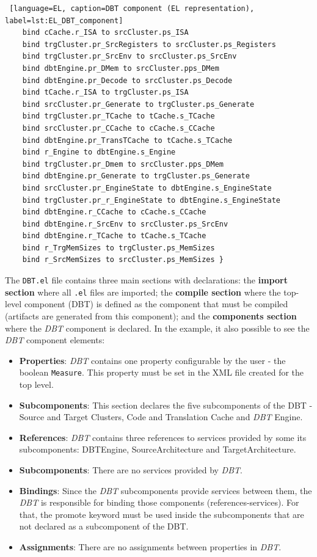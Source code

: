 \documentclass[12pt]{article}
\begin{document}
{\begin{lstlisting} [language=EL, caption=DBT component (EL representation), label=lst:EL_DBT_component]
	bind cCache.r_ISA to srcCluster.ps_ISA
	bind trgCluster.pr_SrcRegisters to srcCluster.ps_Registers
	bind trgCluster.pr_SrcEnv to srcCluster.ps_SrcEnv
	bind dbtEngine.pr_DMem to srcCluster.pps_DMem
	bind dbtEngine.pr_Decode to srcCluster.ps_Decode
	bind tCache.r_ISA to trgCluster.ps_ISA
	bind srcCluster.pr_Generate to trgCluster.ps_Generate
	bind trgCluster.pr_TCache to tCache.s_TCache
	bind srcCluster.pr_CCache to cCache.s_CCache
	bind dbtEngine.pr_TransTCache to tCache.s_TCache
	bind r_Engine to dbtEngine.s_Engine
	bind trgCluster.pr_Dmem to srcCluster.pps_DMem				
	bind dbtEngine.pr_Generate to trgCluster.ps_Generate    	
	bind srcCluster.pr_EngineState to dbtEngine.s_EngineState 	
	bind trgCluster.pr_r_EngineState to dbtEngine.s_EngineState 
	bind dbtEngine.r_CCache to cCache.s_CCache					
	bind dbtEngine.r_SrcEnv to srcCluster.ps_SrcEnv			
	bind dbtEngine.r_TCache to tCache.s_TCache
	bind r_TrgMemSizes to trgCluster.ps_MemSizes
	bind r_SrcMemSizes to srcCluster.ps_MemSizes }
\end{lstlisting}

The \texttt{DBT.el} file contains three main sections with declarations: the \textbf{import section} where all \texttt{.el}
 files are imported; the \textbf{compile section} where the top-level component (DBT) is defined as the component that must be compiled (artifacts are generated from this component); and the \textbf{components section} where the \textit{DBT} component is declared.
In the example, it also possible to see the \textit{DBT} component elements:
\begin{itemize}
\item \textbf{Properties}: \textit{DBT} contains one property configurable by the user - the boolean \texttt{Measure}. This property must be set in the XML file created for the top level.
\item \textbf{Subcomponents}: This section declares the five subcomponents of the DBT - Source and Target Clusters, Code and Translation Cache and \textit{DBT} Engine.
\item \textbf{References}: \textit{DBT} contains three references to services provided by some its subcomponents: DBTEngine, SourceArchitecture and TargetArchitecture.
\item \textbf{Subcomponents}: There are no services provided by \textit{DBT}.
\item \textbf{Bindings}: Since the \textit{DBT} subcomponents provide services between them, the \textit{DBT} is responsible for binding those components (references-services). For that, the promote keyword must be used inside the subcomponents that are not declared as a subcomponent of the DBT. 
\item \textbf{Assignments}: There are no assignments between properties in \textit{DBT}.
\end{itemize}

}
\end{document}
